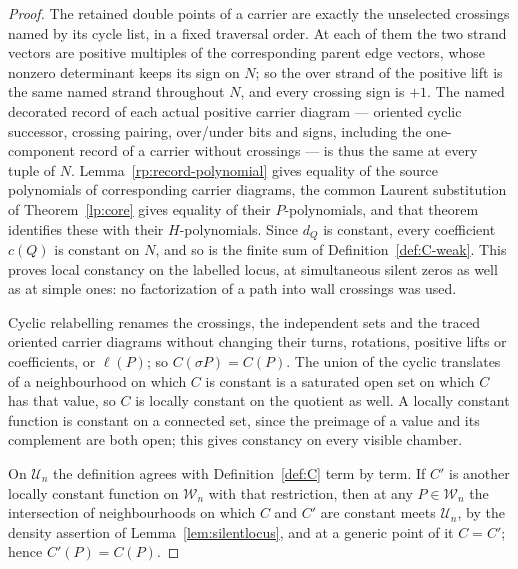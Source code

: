 \begin{proof}
The retained double points of a carrier are exactly the unselected
crossings named by its cycle list, in a fixed traversal order. At each of
them the two strand vectors are positive multiples of the corresponding
parent edge vectors, whose nonzero determinant keeps its sign on $N$; so
the over strand of the positive lift is the same named strand throughout
$N$, and every crossing sign is $+1$. The named decorated record of each
actual positive carrier diagram --- oriented cyclic successor, crossing
pairing, over/under bits and signs, including the one-component record of
a carrier without crossings --- is thus the same at every tuple of $N$.
Lemma~\ref{rp:record-polynomial} gives equality of the source polynomials
of corresponding carrier diagrams, the common Laurent substitution of
Theorem~\ref{lp:core} gives equality of their $P$-polynomials, and that
theorem identifies these with their $H$-polynomials. Since $d_Q$ is
constant, every coefficient $c(Q)$ is constant on $N$, and so is the finite
sum of Definition~\ref{def:C-weak}. This proves local constancy on the
labelled locus, at simultaneous silent zeros as well as at simple ones: no
factorization of a path into wall crossings was used.

Cyclic relabelling renames the crossings, the independent sets and the
traced oriented carrier diagrams without changing their turns, rotations,
positive lifts or coefficients, or $\ell(P)$; so $C(\sigma P)=C(P)$. The
union of the cyclic translates of a neighbourhood on which $C$ is constant
is a saturated open set on which $C$ has that value, so $C$ is locally
constant on the quotient as well. A locally constant function is constant
on a connected set, since the preimage of a value and its complement are
both open; this gives constancy on every visible chamber.

On $\mathcal U_n$ the definition agrees with Definition~\ref{def:C} term by
term. If $C'$ is another locally constant function on $\mathcal W_n$ with
that restriction, then at any $P\in\mathcal W_n$ the intersection of
neighbourhoods on which $C$ and $C'$ are constant meets $\mathcal U_n$, by
the density assertion of Lemma~\ref{lem:silentlocus}, and at a generic
point of it $C=C'$; hence $C'(P)=C(P)$.
\end{proof}

